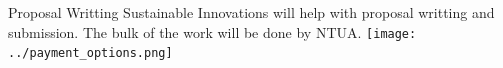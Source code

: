 \documentclass{beamer}
\begin{document}
\begin{frame}{Proposal Writting}
Sustainable Innovations will help with proposal writting and submission. The bulk of the work will be done by NTUA.
\centering
\texttt{[image: ../payment\_options.png]}
\end{frame}

\end{document}
